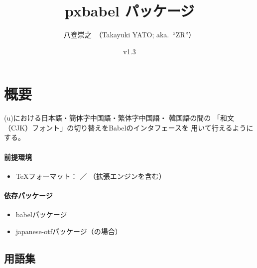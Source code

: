 \documentclass[uplatex,dvipdfmx,a4paper]{jsarticle}
\newcommand{\PkgVersion}{1.3}
\newcommand{\PkgDate}{2021/05/31}
\newcommand{\Pkg}[1]{\textsf{#1}}
\begin{document}
\title{\Pkg{pxbabel} パッケージ}
\author{八登崇之\ （Takayuki YATO; aka.~``ZR''）}
\date{v\PkgVersion \quad [\PkgDate]}
\maketitle

\section{概要}
\label{sec:Overview}

{(u)\pLaTeX}における日本語・簡体字中国語・繁体字中国語・
韓国語の間の
「和文（CJK）フォント」の切り替えをBabelのインタフェースを
用いて行えるようにする。

\paragraph{前提環境}

\begin{itemize}
\item {\TeX}フォーマット： {\pLaTeX}／{\upLaTeX}
  （拡張エンジンを含む）
\end{itemize}

\paragraph{依存パッケージ}

\begin{itemize}
\item \Pkg{babel}パッケージ
\item \Pkg{japanese-otf}パッケージ（{\pLaTeX}の場合）
\end{itemize}

\subsection{用語集}
\label{ssec:terminology}
\end{document}
